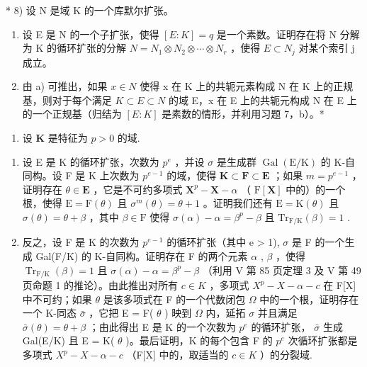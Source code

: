 * 8) 设 N 是域 K 的一个库默尔扩张。

\begin{enumerate}
\def\labelenumi{\alph{enumi})}
\item
  设 E 是 N 的一个子扩张，使得 \([E:K]=q\) 是一个素数。证明存在将 N 分解为 K 的循环扩张的分解 \(N=N_{1}\otimes N_{2}\otimes\cdots\otimes N_{r}\) ，使得 \(E\subset N_{j}\) 对某个索引 j 成立。
\item
  由 a) 可推出，如果 \(x \in N\) 使得 x 在 K 上的共轭元素构成 N 在 K 上的正规基，则对于每个满足 \(K \subset E \subset N\) 的域 E，x 在 E 上的共轭元构成 N 在 E 上的一个正规基（归结为 \([E : K]\) 是素数的情形，并利用习题 7，b）。*
\end{enumerate}

\begin{enumerate}
\def\labelenumi{\arabic{enumi})}
\setcounter{enumi}{8}
\tightlist
\item
  设 \(\mathbf{K}\) 是特征为 \(p > 0\) 的域.
\end{enumerate}

\begin{enumerate}
\def\labelenumi{\alph{enumi})}
\item
  设 E 是 K 的循环扩张，次数为 \(p^e\) ，并设 \(\sigma\) 是生成群 \(\operatorname{Gal}(\mathrm{E} / \mathrm{K})\) 的 K-自同构。设 F 是 K 上次数为 \(p^{e - 1}\) 的域，使得 \(\mathbf{K} \subset \mathbf{F} \subset \mathbf{E}\) ；如果 \(m = p^{e - 1}\) ，证明存在 \(\theta \in \mathbf{E}\) ，它是不可约多项式 \(\mathbf{X}^p - \mathbf{X} - \alpha\) （ \(\mathrm{F}[\mathbf{X}]\) 中的）的一个根，使得 \(\mathrm{E} = \mathrm{F}(\theta)\) 且 \(\sigma^m (\theta) = \theta + 1\) 。证明我们还有 \(\mathrm{E} = \mathrm{K}(\theta)\) 且 \(\sigma (\theta) = \theta + \beta\) ，其中 \(\beta \in \mathrm{F}\) 使得 \(\sigma (\alpha) - \alpha = \beta^p - \beta\) 且 \(\mathrm{Tr}_{\mathrm{F} / \mathrm{K}}(\beta) = 1\) .
\item
  反之，设 F 是 K 的次数为 \(p^{e-1}\) 的循环扩张（其中 e \textgreater{} 1), \(\sigma\) 是 F 的一个生成 Gal(F/K) 的 K-自同构。证明存在 F 的两个元素 \(\alpha\) , \(\beta\) ，使得 \(\operatorname{Tr}_{\mathrm{F}/\mathrm{K}}(\beta) = 1\) 且 \(\sigma(\alpha) - \alpha = \beta^{p} - \beta\) （利用 V 第 85 页定理 3 及 V 第 49 页命题 1 的推论）。由此推出对所有 \(c \in K\) ，多项式 \(X^{p} - X - \alpha - c\) 在 F{[}X{]} 中不可约；如果 \(\theta\) 是该多项式在 F 的一个代数闭包 \(\Omega\) 中的一个根，证明存在一个 K-同态 \(\bar{\sigma}\) ，它把 E = F( \(\theta\) ) 映到 \(\Omega\) 内，延拓 \(\sigma\) 并且满足 \(\bar{\sigma}(\theta) = \theta + \beta\) ；由此得出 E 是 K 的一个次数为 \(p^{e}\) 的循环扩张， \(\bar{\sigma}\) 生成 Gal(E/K) 且 E = K( \(\theta\) )。最后证明，K 的每个包含 F 的 \(p^{e}\) 次循环扩张都是多项式 \(X^{p} - X - \alpha - c\) （F{[}X{]} 中的，取适当的 \(c \in K\) ）的分裂域.
\end{enumerate}

